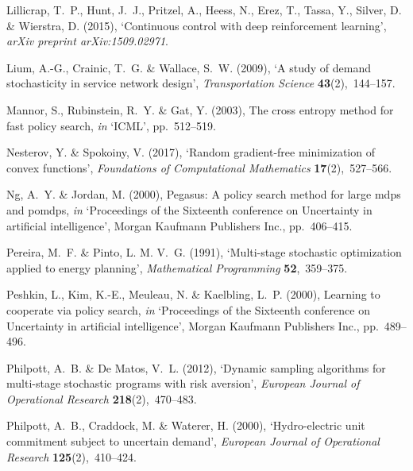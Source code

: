 \documentclass[11pt,oneside,fleqn,reqno,titlepage]{article}
\begin{document}
\begin{thebibliography}{xx}
Lillicrap, T.~P., Hunt, J.~J., Pritzel, A., Heess, N., Erez, T., Tassa, Y.,
  Silver, D. \& Wierstra, D.  (2015), `Continuous control with deep
  reinforcement learning', {\em arXiv preprint arXiv:1509.02971}.

Lium, A.-G., Crainic, T.~G. \& Wallace, S.~W.  (2009), `A study of demand
  stochasticity in service network design', {\em Transportation Science} {\bf
  43}(2),~144--157.

Mannor, S., Rubinstein, R.~Y. \& Gat, Y.  (2003), The cross entropy method for
  fast policy search, {\em in} `ICML', pp.~512--519.

Nesterov, Y. \& Spokoiny, V.  (2017), `Random gradient-free minimization of
  convex functions', {\em Foundations of Computational Mathematics} {\bf
  17}(2),~527--566.

Ng, A.~Y. \& Jordan, M.  (2000), Pegasus: A policy search method for large mdps
  and pomdps, {\em in} `Proceedings of the Sixteenth conference on Uncertainty
  in artificial intelligence', Morgan Kaufmann Publishers Inc., pp.~406--415.

Pereira, M.~F. \& Pinto, L. M. V.~G.  (1991), `{Multi-stage stochastic
  optimization applied to energy planning}', {\em Mathematical Programming}
  {\bf 52},~359--375.

Peshkin, L., Kim, K.-E., Meuleau, N. \& Kaelbling, L.~P.  (2000), Learning to
  cooperate via policy search, {\em in} `Proceedings of the Sixteenth
  conference on Uncertainty in artificial intelligence', Morgan Kaufmann
  Publishers Inc., pp.~489--496.

Philpott, A.~B. \& {De Matos}, V.~L.  (2012), `{Dynamic sampling algorithms for
  multi-stage stochastic programs with risk aversion}', {\em European Journal
  of Operational Research} {\bf 218}(2),~470--483.

Philpott, A.~B., Craddock, M. \& Waterer, H.  (2000), `{Hydro-electric unit
  commitment subject to uncertain demand}', {\em European Journal of
  Operational Research} {\bf 125}(2),~410--424.


\end{thebibliography}
\end{document}
